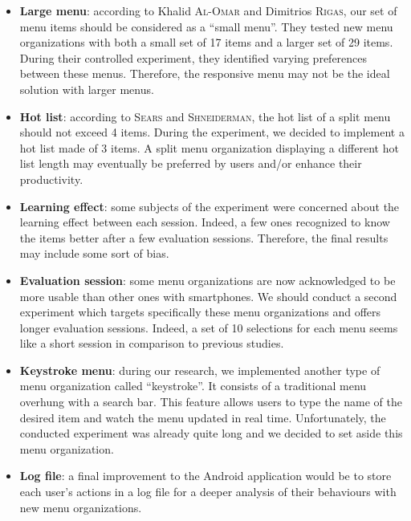\begin{itemize}
 \item \textbf{Large menu}: according to Khalid \textsc{Al-Omar} and Dimitrios 
\textsc{Rigas}, our set of menu items should be considered as a \enquote{small 
menu}. They tested new menu organizations with both a small set of 17 items and 
a larger set of 29 items. During their controlled experiment, they identified 
varying preferences between these menus. Therefore, the responsive menu may not 
be the ideal solution with larger menus.
 \item \textbf{Hot list}: according to \textsc{Sears} and 
\textsc{Shneiderman}, the hot list of a split menu should not exceed 4 items. 
During the experiment, we decided to implement a hot list made of 3 items. A 
split menu organization displaying a different hot list length may eventually 
be preferred by users and/or enhance their productivity.
 \item \textbf{Learning effect}: some subjects of the experiment were concerned 
about the learning effect between each session. Indeed, a few ones recognized 
to know the items better after a few evaluation sessions. Therefore, the 
final results may include some sort of bias.
 \item \textbf{Evaluation session}: some menu organizations are now 
acknowledged to be more usable than other ones with smartphones. We should 
conduct a second experiment which targets specifically these menu organizations 
and offers longer evaluation sessions. Indeed, a set of 10 selections for 
each menu seems like a short session in comparison to previous studies.
 \item \textbf{Keystroke menu}: during our research, we implemented another 
type of menu organization called \enquote{keystroke}. It consists of a 
traditional menu overhung with a search bar. This feature allows users 
to type the name of the desired item and watch the menu updated in real time. 
Unfortunately, the conducted experiment was already quite long and we decided 
to set aside this menu organization.
 \item \textbf{Log file}: a final improvement to the Android application would 
be to store each user's actions in a log file for a deeper analysis of their 
behaviours with new menu organizations.
\end{itemize}
